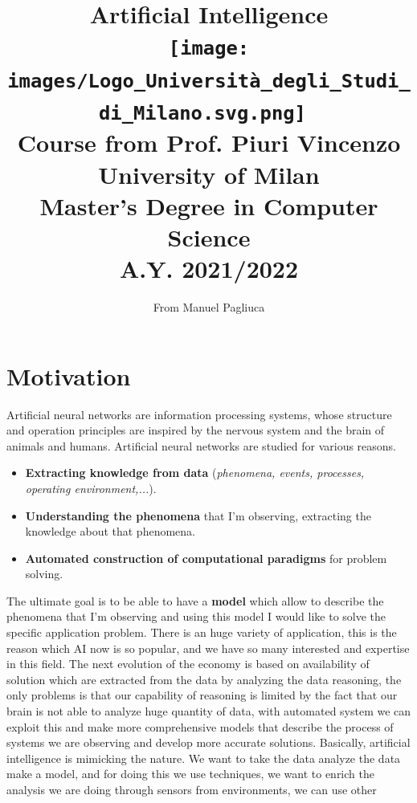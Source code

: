 \documentclass{article}
\title{%
\textbf{Artificial Intelligence}
\\[1cm]
\texttt{[image: images/Logo\_Università\_degli\_Studi\_di\_Milano.svg.png]}~
\\[1cm]
\large Course from Prof. Piuri Vincenzo\\
  University of Milan\\
  Master's Degree in Computer Science\\
   A.Y. 2021/2022}
\author{From Manuel Pagliuca}
\begin{document}
\maketitle
\pagebreak
\tableofcontents
\newpage
\pagebreak
\section{Motivation}
Artificial neural networks are information processing systems, whose structure and
operation principles are inspired by the nervous system and the brain of animals and
humans.
\newline\newline
Artificial neural networks are studied for various reasons.
\begin{itemize}
    \item \textbf{Extracting knowledge from data} (\textit{phenomena, events, processes, operating environment,...}).
    \item \textbf{Understanding the phenomena} that I’m observing, extracting the knowledge about that phenomena.
    \item \textbf{Automated construction of computational paradigms} for problem solving.
\end{itemize}
The ultimate goal is to be able to have a \textbf{model} which allow to describe the phenomena
that I’m observing and using this model I would like to solve the specific application problem.
\newline\newline
There is an huge variety of application, this is the reason which AI now is so popular, and we
have so many interested and expertise in this field.
\newline\newline
The next evolution of the economy is based on availability of solution which are extracted
from the data by analyzing the data reasoning, the only problems is that our capability
of reasoning is limited by the fact that our brain is not able to analyze huge quantity
of data, with automated system we can exploit this and make more comprehensive models that describe
the process of systems we are observing and develop more accurate solutions.
\newline\newline
Basically, artificial intelligence is mimicking the nature. We want to take the data
analyze the data make a model, and for doing this we use techniques, we want to enrich
the analysis we are doing through sensors from environments, we can use other
\end{document}
